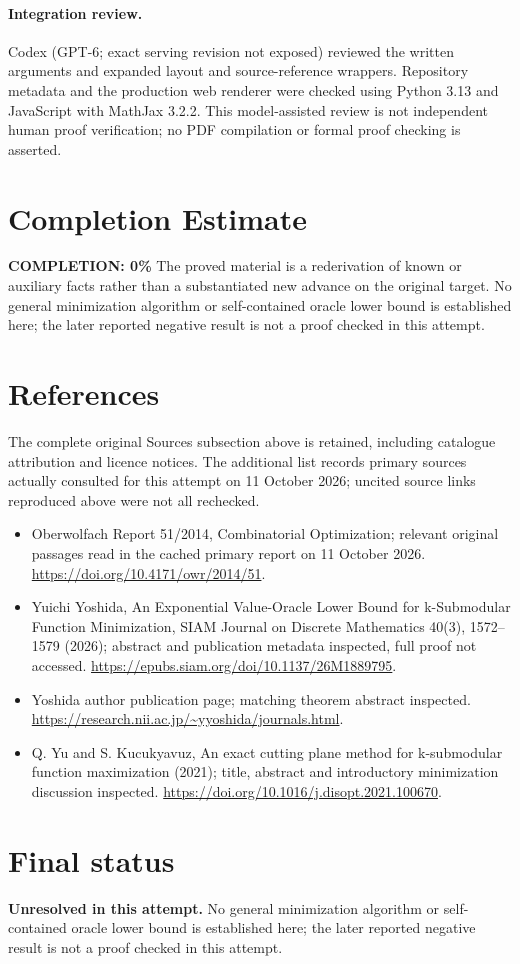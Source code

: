 \documentclass[11pt]{article}
\begin{document}
\paragraph{Integration review.} Codex (GPT-6; exact serving revision not exposed) reviewed the written arguments and expanded layout and source-reference wrappers. Repository metadata and the production web renderer were checked using Python 3.13 and JavaScript with MathJax 3.2.2. This model-assisted review is not independent human proof verification; no PDF compilation or formal proof checking is asserted.

\section{Completion Estimate}
\noindent\textbf{COMPLETION: 0\%}
The proved material is a rederivation of known or auxiliary facts rather than a substantiated new advance on the original target. No general minimization algorithm or self-contained oracle lower bound is established here; the later reported negative result is not a proof checked in this attempt.
\section{References}
The complete original Sources subsection above is retained, including catalogue attribution and licence notices. The additional list records primary sources actually consulted for this attempt on 11 October 2026; uncited source links reproduced above were not all rechecked.
\begin{itemize}
\item Oberwolfach Report 51/2014, Combinatorial Optimization; relevant original passages read in the cached primary report on 11 October 2026. \url{https://doi.org/10.4171/owr/2014/51}.
\item Yuichi Yoshida, An Exponential Value-Oracle Lower Bound for k-Submodular Function Minimization, SIAM Journal on Discrete Mathematics 40(3), 1572--1579 (2026); abstract and publication metadata inspected, full proof not accessed. \url{https://epubs.siam.org/doi/10.1137/26M1889795}.
\item Yoshida author publication page; matching theorem abstract inspected. \url{https://research.nii.ac.jp/~yyoshida/journals.html}.
\item Q. Yu and S. Kucukyavuz, An exact cutting plane method for k-submodular function maximization (2021); title, abstract and introductory minimization discussion inspected. \url{https://doi.org/10.1016/j.disopt.2021.100670}.
\end{itemize}
\section{Final status}
\textbf{Unresolved in this attempt.} No general minimization algorithm or self-contained oracle lower bound is established here; the later reported negative result is not a proof checked in this attempt.
\end{document}
